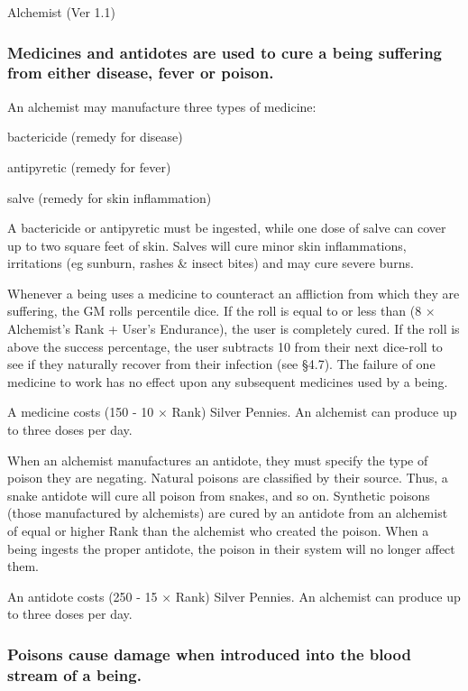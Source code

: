 \begin{Chapter}{Alchemist (Ver 1.1)}
\subsubsection{Medicines and antidotes are used to cure a being suffering from either
disease, fever or poison.}

An  alchemist  may  manufacture  three  types  of 
medicine:  

\begin{Itemize}

\item bactericide (remedy for disease)  

\item antipyretic (remedy for fever)  

\item salve (remedy for skin inflammation) 

\end{Itemize}

A bactericide or antipyretic must be ingested, while one dose of salve
can cover up to two square feet of skin. Salves will cure minor skin
inflammations, irritations (eg sunburn, rashes \& insect bites) and
may cure severe burns.

Whenever a being uses a medicine to counteract an affliction from
which they are suffering, the GM rolls percentile dice.  If the roll
is equal to or less than (8 × Alchemist’s Rank + User’s Endurance),
the user is completely cured. If the roll is above the success
percentage, the user subtracts 10 from their next dice-roll to see if
they naturally recover from their infection (see §4.7). The failure of
one medicine to work has no effect upon any subsequent medicines
used by a being.

A medicine costs (150 - 10 × Rank) Silver Pennies.  An alchemist can
produce up to three doses per day.

When an alchemist manufactures an antidote, they must specify the type
of poison they are negating.  Natural poisons are classified by their
source.  Thus, a snake antidote will cure all poison from snakes, and
so on. Synthetic poisons (those manufactured by alchemists) are cured
by an antidote from an alchemist of equal or higher Rank than the
alchemist who created the poison.  When a being ingests the proper
antidote, the poison in their system will no longer affect them.

An antidote costs (250 - 15 × Rank) Silver Pennies.  An alchemist can
produce up to three doses per day.

\subsubsection{Poisons cause damage when introduced into the 
blood stream of a being.}


\end{Chapter}

